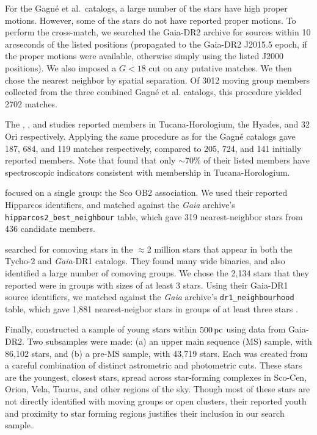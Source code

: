 \documentclass[12pt,twocolumn,tighten]{aastex62}
\begin{document}
For the Gagn\'e et al{.}~catalogs, a large
number of the stars have high proper motions.
However, some of the stars do not have reported proper motions.
To perform the cross-match,
we searched the Gaia-DR2 archive for
sources within 10 arcseconds of the listed positions (propagated to the
Gaia-DR2 J2015.5 epoch, if the proper motions were available, otherwise
simply using the listed J2000 positions).
We also imposed a $G<18$ cut on any putative matches. 
We then chose the nearest neighbor by spatial separation.
Of 3012 moving group members collected from the
three combined Gagn\'e et al{.}
catalogs, this procedure yielded 2702 matches.

The \citet{kraus_tucanahor_2014}, \citet{roser_deep_2011}, and
\citet{bell_32ori_2017} studies reported members in Tucana-Horologium,
the Hyades, and 32$\,$Ori respectively.  Applying the same procedure as
for the Gagn\'e catalogs gave 187, 684, and 119 matches
respectively, compared to 205, 724, and 141 initially reported
members.  Note that \citet{kraus_tucanahor_2014} found that only
$\sim$70\% of their listed members have spectroscopic indicators
consistent with membership in Tucana-Horologium.

\citet{rizzuto_multidimensional_2011} focused on a single
group: the Sco OB2 association. We used their reported Hipparcos
identifiers, and matched against the {\it Gaia} archive's
\texttt{hipparcos2\_best\_neighbour} table, which gave 319
nearest-neighbor stars from 436 candidate members.

\citet{oh_comoving_2017} searched for comoving stars in the
$\approx$2 million stars that appear in both the Tycho-2 and {\it
Gaia}-DR1 catalogs.  They found many wide binaries, and also identified a large
number of comoving groups.  We chose the 2{,}134 stars that they
reported were in groups with sizes of at least 3 stars.  Using their
Gaia-DR1 source identifiers, we matched against the {\it Gaia}
archive's \texttt{dr1\_neighbourhood} table, which gave 1{,}881
nearest-neigbor stars in groups of at least three stars
\citep{marrese_gaia_2019}.

Finally, \citet{zari_3d_2018} constructed a sample of young stars
within $500\,{\rm pc}$ using data from Gaia-DR2. Two subsamples were
made: (a) an upper main sequence (MS) sample, with 86{,}102 stars, and
(b) a pre-MS sample, with 43{,}719 stars.  Each was created from a
careful combination of distinct astrometric and photometric cuts.
These stars are the youngest, closest stars, spread across
star-forming complexes in Sco-Cen, Orion, Vela, Taurus, and other
regions of the sky.  Though most of these stars are not directly
identified with moving groups or open clusters, their reported
youth and proximity to star
forming regions justifies their inclusion in our search sample.
\end{document}
